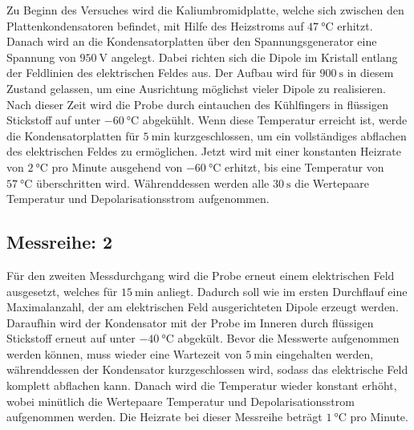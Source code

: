 Zu Beginn des Versuches wird die Kaliumbromidplatte, welche sich zwischen den\\
Plattenkondensatoren befindet,
mit Hilfe des Heizstroms auf $\SI{47}{\celsius}$ erhitzt.
Danach wird an die Kondensatorplatten über den 
Spannungsgenerator eine Spannung von $\SI{950}{\volt}$ angelegt. 
Dabei richten sich die Dipole im Kristall entlang der Feldlinien des elektrischen 
Feldes aus.
Der Aufbau wird für $\SI{900}{\second}$ in diesem Zustand gelassen, um eine 
Ausrichtung möglichst vieler Dipole zu realisieren.
Nach dieser Zeit wird die Probe durch eintauchen des Kühlfingers in 
flüssigen Stickstoff auf unter $\SI{-60}{\celsius}$ abgekühlt.
Wenn diese Temperatur erreicht ist, werde die Kondensatorplatten für 
$\SI{5}{\minute}$ kurzgeschlossen,
um ein vollständiges abflachen des elektrischen Feldes zu ermöglichen.
Jetzt wird mit einer konstanten Heizrate von $\SI{2}{\celsius}$ pro Minute 
ausgehend von 
$\SI{-60}{\celsius}$ erhitzt, bis eine Temperatur von $\SI{57}{\celsius}$ 
überschritten wird. 
Währenddessen werden alle $\SI{30}{\second}$ die Wertepaare Temperatur und 
Depolarisationsstrom aufgenommen.


\subsection{Messreihe: 2}

Für den zweiten Messdurchgang wird die Probe erneut einem elektrischen Feld ausgesetzt,
welches für $\SI{15}{\minute}$ anliegt. Dadurch soll wie im ersten Durchflauf eine Maximalanzahl,
der am elektrischen Feld ausgerichteten Dipole erzeugt werden.
Daraufhin wird der Kondensator mit der Probe im Inneren durch flüssigen Stickstoff erneut auf 
unter $\SI{-40}{\celsius}$ abgekült. Bevor die Messwerte aufgenommen werden können, muss wieder 
eine Wartezeit von $\SI{5}{\minute}$ eingehalten werden, währenddessen der Kondensator 
kurzgeschlossen wird, sodass das elektrische Feld komplett abflachen kann.
Danach wird die Temperatur wieder konstant erhöht, wobei minütlich die Wertepaare
Temperatur und Depolarisationsstrom aufgenommen werden. Die Heizrate bei dieser 
Messreihe beträgt $\SI{1}{\celsius}$ pro Minute. 
\newpage
